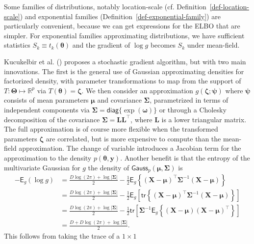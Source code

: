 \documentclass[
  11pt,
  letterpaper,
]{scrbook}
\theoremstyle{definition}
\theoremstyle{definition}
\theoremstyle{definition}
\theoremstyle{plain}
\theoremstyle{plain}
\theoremstyle{plain}
\theoremstyle{remark}
\begin{document}
Some families of distributions, notably location-scale (cf.
Definition~\ref{def-location-scale}) and exponential families
(Definition~\ref{def-exponential-family}) are particularly convenient,
because we can get expressions for the ELBO that are simpler. For
exponential families approximating distributions, we have sufficient
statistics \(S_k \equiv t_k(\boldsymbol{\theta})\) and the gradient of
\(\log g\) becomes \(S_k\) under mean-field.

Kucukelbir et al. () proposes a
stochastic gradient algorithm, but with two main innovations. The first
is the general use of Gaussian approximating densities for factorized
density, with parameter transformations to map from the support of
\(T: \boldsymbol{\Theta} \mapsto \mathbb{R}^p\) via
\(T(\boldsymbol{\theta})=\boldsymbol{\zeta}.\) We then consider an
approximation \(g(\boldsymbol{\zeta}; \boldsymbol{\psi})\) where
\(\boldsymbol{\psi}\) consists of mean parameters \(\boldsymbol{\mu}\)
and covariance \(\boldsymbol{\Sigma}\), parametrized in terms of
independent components via
\(\boldsymbol{\Sigma}=\mathsf{diag}\{\exp(\boldsymbol{\omega})\}\) or
through a Cholesky decomposition of the covariance
\(\boldsymbol{\Sigma} = \mathbf{LL}^\top\), where \(\mathbf{L}\) is a
lower triangular matrix. The full approximation is of course more
flexible when the transformed parameters \(\boldsymbol{\zeta}\) are
correlated, but is more expensive to compute than the mean-field
approximation. The change of variable introduces a Jacobian term for the
approximation to the density \(p(\boldsymbol{\theta}, \boldsymbol{y}).\)
Another benefit is that the entropy of the multivariate Gaussian for
\(g\) the density of
\(\mathsf{Gauss}_p(\boldsymbol{\mu}, \boldsymbol{\Sigma})\) is
\begin{align*}
 - \mathsf{E}_g(\log g) &= \frac{D\log(2\pi) + \log|\boldsymbol{\Sigma}|}{2} - \frac{1}{2}\mathsf{E}_g\left\{ (\boldsymbol{X}-\boldsymbol{\mu})^\top\boldsymbol{\Sigma}^{-1}(\boldsymbol{X}-\boldsymbol{\mu})\right\} \\& = \frac{D\log(2\pi) + \log|\boldsymbol{\Sigma}|}{2} - \frac{1}{2}\mathsf{E}_g\left[ \mathsf{tr}\left\{(\boldsymbol{X}-\boldsymbol{\mu})^\top\boldsymbol{\Sigma}^{-1}(\boldsymbol{X}-\boldsymbol{\mu})\right\}\right]
 \\& =  \frac{D\log(2\pi) + \log|\boldsymbol{\Sigma}|}{2} - \frac{1}{2}\mathsf{tr}\left[\boldsymbol{\Sigma}^{-1}\mathsf{E}_g\left\{(\boldsymbol{X}-\boldsymbol{\mu})(\boldsymbol{X}-\boldsymbol{\mu})^\top\right\}\right]
 \\& =\frac{D+D\log(2\pi) + \log |\boldsymbol{\Sigma}|}{2}.
\end{align*} This follows from taking the trace of a \(1\times 1\)
\end{document}
